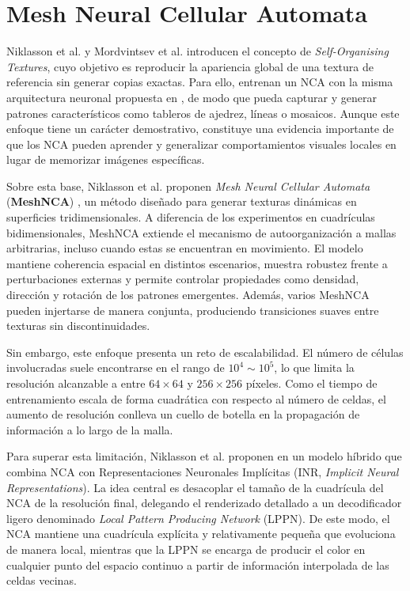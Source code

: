 \section{Mesh Neural Cellular Automata}

Niklasson et al. \cite{niklassonMNCA} y Mordvintsev et al. \cite{niklassonMNCA2} \cite{mordvintsevUNCA} introducen el concepto de \textit{Self-Organising Textures}, cuyo objetivo es reproducir la apariencia global de una textura de referencia sin generar copias exactas. Para ello, entrenan un NCA con la misma arquitectura neuronal propuesta en \cite{mordvintsevNCA}, de modo que pueda capturar y generar patrones característicos como tableros de ajedrez, líneas o mosaicos. Aunque este enfoque tiene un carácter demostrativo, constituye una evidencia importante de que los NCA pueden aprender y generalizar comportamientos visuales locales en lugar de memorizar imágenes específicas.

Sobre esta base, Niklasson et al. proponen \textit{Mesh Neural Cellular Automata} (\textbf{MeshNCA}) \cite{meshNCA}, un método diseñado para generar texturas dinámicas en superficies tridimensionales. A diferencia de los experimentos en cuadrículas bidimensionales, MeshNCA extiende el mecanismo de autoorganización a mallas arbitrarias, incluso cuando estas se encuentran en movimiento. El modelo mantiene coherencia espacial en distintos escenarios, muestra robustez frente a perturbaciones externas y permite controlar propiedades como densidad, dirección y rotación de los patrones emergentes. Además, varios MeshNCA pueden injertarse de manera conjunta, produciendo transiciones suaves entre texturas sin discontinuidades.

Sin embargo, este enfoque presenta un reto de escalabilidad. El número de células involucradas suele encontrarse en el rango de $10^4 \sim 10^5$, lo que limita la resolución alcanzable a entre $64 \times 64$ y $256 \times 256$ píxeles. Como el tiempo de entrenamiento escala de forma cuadrática con respecto al número de celdas, el aumento de resolución conlleva un cuello de botella en la propagación de información a lo largo de la malla.

Para superar esta limitación, Niklasson et al. proponen en \cite{meshNCA2} un modelo híbrido que combina NCA con Representaciones Neuronales Implícitas (INR, \textit{Implicit Neural Representations}). La idea central es desacoplar el tamaño de la cuadrícula del NCA de la resolución final, delegando el renderizado detallado a un decodificador ligero denominado \textit{Local Pattern Producing Network} (LPPN). De este modo, el NCA mantiene una cuadrícula explícita y relativamente pequeña que evoluciona de manera local, mientras que la LPPN se encarga de producir el color en cualquier punto del espacio continuo a partir de información interpolada de las celdas vecinas.

